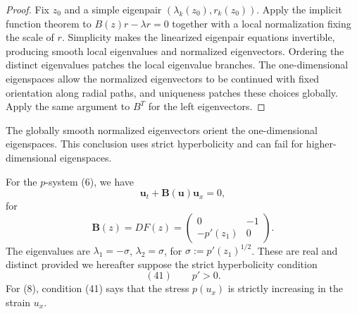 \begin{proof}
\sketch Fix $z_0$ and a simple eigenpair $(\lambda_k(z_0),r_k(z_0))$. Apply the implicit function theorem to $B(z)r-\lambda r=0$ together with a local normalization fixing the scale of $r$. Simplicity makes the linearized eigenpair equations invertible, producing smooth local eigenvalues and normalized eigenvectors. Ordering the distinct eigenvalues patches the local eigenvalue branches. The one-dimensional eigenspaces allow the normalized eigenvectors to be continued with fixed orientation along radial paths, and uniqueness patches these choices globally. Apply the same argument to $B^T$ for the left eigenvectors.
\end{proof}

\begin{remark}
\label{rem:global-orientation-eigenspaces}

The globally smooth normalized eigenvectors orient the one-dimensional eigenspaces. This conclusion uses strict hyperbolicity and can fail for higher-dimensional eigenspaces.
\end{remark}

\begin{example}
\label{ex:p-system-strict-hyperbolicity}

For the $p$-system (6), we have
$$\mathbf{u}_t + \mathbf{B}(\mathbf{u})\mathbf{u}_x = 0,$$
for
$$\mathbf{B}(z) = DF(z) = \begin{pmatrix} 0 & -1 \\ -p'(z_1) & 0 \end{pmatrix}.$$
The eigenvalues are $\lambda_1=-\sigma$, $\lambda_2=\sigma$, for $\sigma:=p'(z_1)^{1/2}$. These are real and distinct provided we hereafter suppose the strict hyperbolicity condition
$$(41) \qquad p'>0.$$
For (8), condition (41) says that the stress $p(u_x)$ is strictly increasing in the strain $u_x$.
\end{example}

